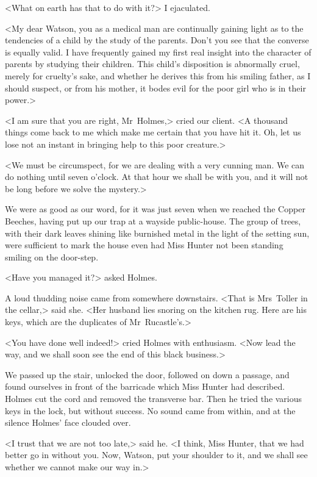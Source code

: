 <What on earth has that to do with it?> I ejaculated.

<My dear Watson, you as a medical man are continually gaining light as to the tendencies of a child by the study of the parents. Don't you see that the converse is equally valid. I have frequently gained my first real insight into the character of parents by studying their children. This child's disposition is abnormally cruel, merely for cruelty's sake, and whether he derives this from his smiling father, as I should suspect, or from his mother, it bodes evil for the poor girl who is in their power.>

<I am sure that you are right, Mr~Holmes,> cried our client. <A thousand things come back to me which make me certain that you have hit it. Oh, let us lose not an instant in bringing help to this poor creature.>

<We must be circumspect, for we are dealing with a very cunning man. We can do nothing until seven o'clock. At that hour we shall be with you, and it will not be long before we solve the mystery.>

We were as good as our word, for it was just seven when we reached the Copper Beeches, having put up our trap at a wayside public-house. The group of trees, with their dark leaves shining like burnished metal in the light of the setting sun, were sufficient to mark the house even had Miss Hunter not been standing smiling on the door-step.

<Have you managed it?> asked Holmes.

A loud thudding noise came from somewhere downstairs. <That is Mrs~Toller in the cellar,> said she. <Her husband lies snoring on the kitchen rug. Here are his keys, which are the duplicates of Mr~Rucastle's.>

<You have done well indeed!> cried Holmes with enthusiasm. <Now lead the way, and we shall soon see the end of this black business.>

We passed up the stair, unlocked the door, followed on down a passage, and found ourselves in front of the barricade which Miss Hunter had described. Holmes cut the cord and removed the transverse bar. Then he tried the various keys in the lock, but without success. No sound came from within, and at the silence Holmes' face clouded over.

<I trust that we are not too late,> said he. <I think, Miss Hunter, that we had better go in without you. Now, Watson, put your shoulder to it, and we shall see whether we cannot make our way in.>

